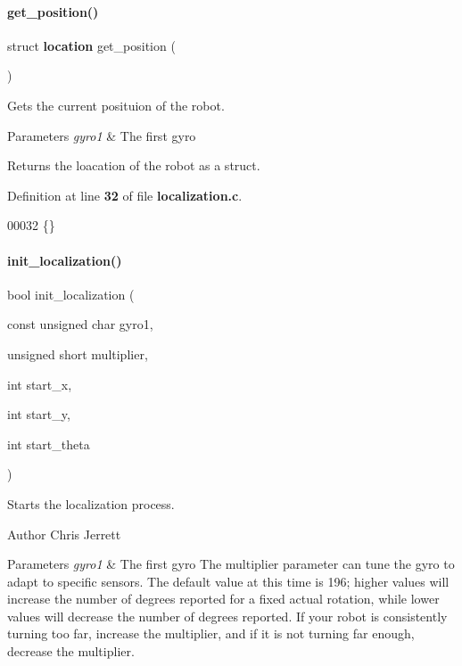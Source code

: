 \paragraph{get\+\_\+position()}
{\footnotesize\ttfamily struct \textbf{ location} get\+\_\+position (\begin{DoxyParamCaption}{ }\end{DoxyParamCaption})}



Gets the current posituion of the robot. 


\begin{DoxyParams}{Parameters}
{\em gyro1} & The first gyro \\
\hline
\end{DoxyParams}
\begin{DoxyReturn}{Returns}
the loacation of the robot as a struct. 
\end{DoxyReturn}


Definition at line \textbf{ 32} of file \textbf{ localization.\+c}.


\begin{DoxyCode}
00032 \{\}
\end{DoxyCode}
\mbox{\label{a00032_afdd0147de6aa15957e9a125f9cd20578}} 
\paragraph{init\+\_\+localization()}
{\footnotesize\ttfamily bool init\+\_\+localization (\begin{DoxyParamCaption}\item[{const unsigned char}]{gyro1,  }\item[{unsigned short}]{multiplier,  }\item[{int}]{start\+\_\+x,  }\item[{int}]{start\+\_\+y,  }\item[{int}]{start\+\_\+theta }\end{DoxyParamCaption})}



Starts the localization process. 

\begin{DoxyAuthor}{Author}
Chris Jerrett
\end{DoxyAuthor}

\begin{DoxyParams}{Parameters}
{\em gyro1} & The first gyro  The multiplier parameter can tune the gyro to adapt to specific sensors. The default value at this time is 196; higher values will increase the number of degrees reported for a fixed actual rotation, while lower values will decrease the number of degrees reported. If your robot is consistently turning too far, increase the multiplier, and if it is not turning far enough, decrease the multiplier. \\
\hline
\end{DoxyParams}



